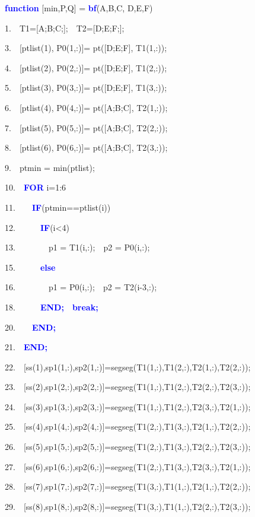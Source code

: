 \documentclass[times,12pt]{ACME2015article}
\newenvironment{lyxcode}
{\par\begin{list}{}{
\setlength{\rightmargin}{\leftmargin}
\setlength{\listparindent}{0pt}%
\raggedright
\setlength{\itemsep}{0pt}
\setlength{\parsep}{0pt}
\normalfont\ttfamily}%
 \item[]}
{\end{list}}
\begin{document}
\begin{algorithm}
\begin{lyxcode}
\textbf{\textcolor{blue}{function}} [min,P,Q] = \textbf{\textcolor{blue}{bf}}(A,B,C, D,E,F)

1.~~T1=[A;B;C;];~~T2=[D;E;F;];

3.~~[ptlist(1), P0(1,:)]= pt([D;E;F], T1(1,:));

4.~~[ptlist(2), P0(2,:)]= pt([D;E;F], T1(2,:));

5.~~[ptlist(3), P0(3,:)]= pt([D;E;F], T1(3,:));

6.~~[ptlist(4), P0(4,:)]= pt([A;B;C], T2(1,:));

7.~~[ptlist(5), P0(5,:)]= pt([A;B;C], T2(2,:));

8.~~[ptlist(6), P0(6,:)]= pt([A;B;C], T2(3,:));

9.~~ptmin = min(ptlist);

10.~~\textbf{\textcolor{blue}{FOR}} i=1:6

11.~~~~\textbf{\textcolor{blue}{IF}}(ptmin==ptlist(i))

12.~~~~~~\textbf{\textcolor{blue}{IF}}(i<4)

13.~~~~~~~~p1 = T1(i,:);~~p2 = P0(i,:);

15.~~~~~~\textbf{\textcolor{blue}{else}}

16.~~~~~~~~p1 = P0(i,:);~~p2 = T2(i-3,:);

18.~~~~~~\textbf{\textcolor{blue}{END;}}~~\textbf{\textcolor{blue}{break;}}

20.~~~~\textbf{\textcolor{blue}{END;}}

21.~~\textbf{\textcolor{blue}{END;}}

22.~~[ss(1),sp1(1,:),sp2(1,:)]=segseg(T1(1,:),T1(2,:),T2(1,:),T2(2,:));

23.~~[ss(2),sp1(2,:),sp2(2,:)]=segseg(T1(1,:),T1(2,:),T2(2,:),T2(3,:));

24.~~[ss(3),sp1(3,:),sp2(3,:)]=segseg(T1(1,:),T1(2,:),T2(3,:),T2(1,:));

25.~~[ss(4),sp1(4,:),sp2(4,:)]=segseg(T1(2,:),T1(3,:),T2(1,:),T2(2,:));

26.~~[ss(5),sp1(5,:),sp2(5,:)]=segseg(T1(2,:),T1(3,:),T2(2,:),T2(3,:));

27.~~[ss(6),sp1(6,:),sp2(6,:)]=segseg(T1(2,:),T1(3,:),T2(3,:),T2(1,:));

28.~~[ss(7),sp1(7,:),sp2(7,:)]=segseg(T1(3,:),T1(1,:),T2(1,:),T2(2,:));

29.~~[ss(8),sp1(8,:),sp2(8,:)]=segseg(T1(3,:),T1(1,:),T2(2,:),T2(3,:));


\end{lyxcode}
\end{algorithm}
\end{document}
